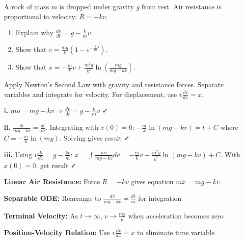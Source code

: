 \begin{problem}
A rock of mass $m$ is dropped under gravity $g$ from rest. Air resistance is proportional to velocity: $R = -kv$.
\begin{enumerate}[label=\textbf{\roman*.}]
    \item Explain why $\frac{dv}{dt} = g - \frac{k}{m}v$.
    \item Show that $v = \frac{mg}{k}\left(1 - e^{-\frac{k}{m}t}\right)$.
    \item Show that $x = -\frac{m}{k}v + \frac{m^2g}{k^2}\ln\left(\frac{mg}{mg-kv}\right)$.
\end{enumerate}
\end{problem}

\begin{hint}
Apply Newton's Second Law with gravity and resistance forces. Separate variables and integrate for velocity. For displacement, use $v\frac{dv}{dx} = \ddot{x}$.
\end{hint}

\begin{solution}
\textbf{i.} $ma = mg - kv \Rightarrow \frac{dv}{dt} = g - \frac{k}{m}v$ ✓

\textbf{ii.} $\frac{dv}{mg-kv} = \frac{dt}{m}$. Integrating with $v(0)=0$: $-\frac{m}{k}\ln(mg-kv) = t + C$ where $C = -\frac{m}{k}\ln(mg)$. Solving gives result ✓

\textbf{iii.} Using $v\frac{dv}{dx} = g - \frac{kv}{m}$: $x = \int \frac{mv}{mg-kv}dv = -\frac{m}{k}v - \frac{m^2g}{k^2}\ln(mg-kv) + C$. With $x(0)=0$, get result ✓
\end{solution}

\begin{takeaways}
\item \textbf{Linear Air Resistance:} Force $R = -kv$ gives equation $m\ddot{x} = mg - kv$
\item \textbf{Separable ODE:} Rearrange to $\frac{dv}{mg-kv} = \frac{dt}{m}$ for integration
\item \textbf{Terminal Velocity:} As $t \to \infty$, $v \to \frac{mg}{k}$ when acceleration becomes zero
\item \textbf{Position-Velocity Relation:} Use $v\frac{dv}{dx} = \ddot{x}$ to eliminate time variable
\end{takeaways}

